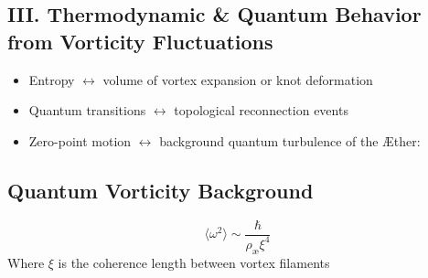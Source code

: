 \subsection*{III. Thermodynamic & Quantum Behavior from Vorticity Fluctuations}
\begin{itemize}
    \item Entropy \(\leftrightarrow\) volume of vortex expansion or knot deformation
    \item Quantum transitions \(\leftrightarrow\) topological reconnection events
    \item Zero-point motion \(\leftrightarrow\) background quantum turbulence of the Æther:
\end{itemize}
\subsection*{Quantum Vorticity Background}
\begin{equation}
    \langle \omega^2 \rangle \sim \frac{\hbar}{\rho_\text{æ} \xi^4}
\end{equation}
Where \(\xi\) is the coherence length between vortex filaments